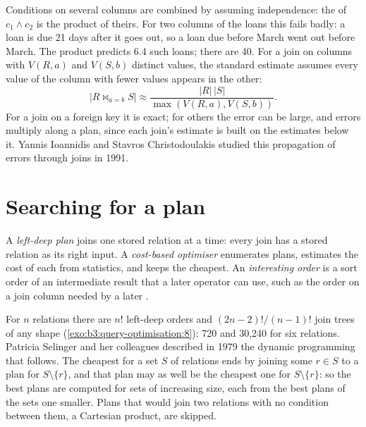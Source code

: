 Conditions on several columns are combined by assuming independence: the  of $c_1 \wedge c_2$ is the product of theirs. For two columns of the loans this fails badly: a loan is due 21 days after it goes out, so a loan due before March went out before March. The product predicts 6.4 such loans; there are 40. For a join on columns with $V(R, a)$ and $V(S, b)$ distinct values, the standard estimate assumes every value of the column with fewer values appears in the other:
\[ |R \bowtie_{a = b} S| \approx \frac{|R|\,|S|}{\max(V(R, a), V(S, b))}. \]
For a join on a foreign key it is exact; for others the error can be large, and errors multiply along a plan, since each join's estimate is built on the estimates below it. Yannis Ioannidis and Stavros Christodoulakis studied this propagation of errors through joins in 1991. %

\section{Searching for a plan}\label{sec:b3:query-optimisation:search}

\begin{definition}\label{def:b3:query-optimisation:search}
A \emph{left-deep plan} joins one stored relation at a time: every join has a stored relation as its right input. A \emph{cost-based optimiser} enumerates plans, estimates the cost of each from statistics, and keeps the cheapest. An \emph{interesting order} is a sort order of an intermediate result that a later operator can use, such as the order on a join column needed by a later .
\end{definition}

For $n$ relations there are $n!$ left-deep orders and $(2n - 2)!/(n - 1)!$ join trees of any shape (\cref{exo:b3:query-optimisation:8}): 720 and 30,240 for six relations. Patricia Selinger and her colleagues described in 1979 the dynamic programming that follows. %
The cheapest  for a set $S$ of relations ends by joining some $r \in S$ to a plan for $S \setminus \{r\}$, and that plan may as well be the cheapest one for $S \setminus \{r\}$: so the best plans are computed for sets of increasing size, each from the best plans of the sets one smaller. Plans that would join two relations with no condition between them, a Cartesian product, are skipped.

